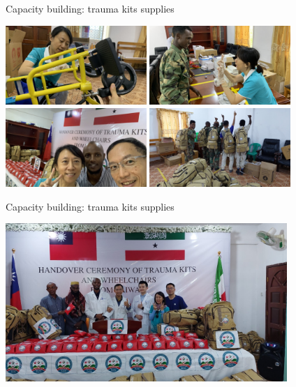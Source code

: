 \documentclass[aspectratio=169]{beamer}
\begin{document}
\begin{frame}{Capacity building: trauma kits supplies}
    \begin{center}
        \includegraphics[width=0.4\textwidth]{IMG-2641.jpg}
        \includegraphics[width=0.4\textwidth]{IMG-2230.jpg} \\
        \includegraphics[width=0.4\textwidth]{IMG-2611.jpg}
        \includegraphics[width=0.4\textwidth]{IMG-2318.JPG}    
    \end{center}
\end{frame}

\begin{frame}{Capacity building: trauma kits supplies}
    \begin{center}
        \includegraphics[width=0.8\textwidth]{4879921870343011711.12ba1a84484c21cdb54161b56f33e999.23050712.JPG}
    \end{center}
\end{frame}
\end{document}
